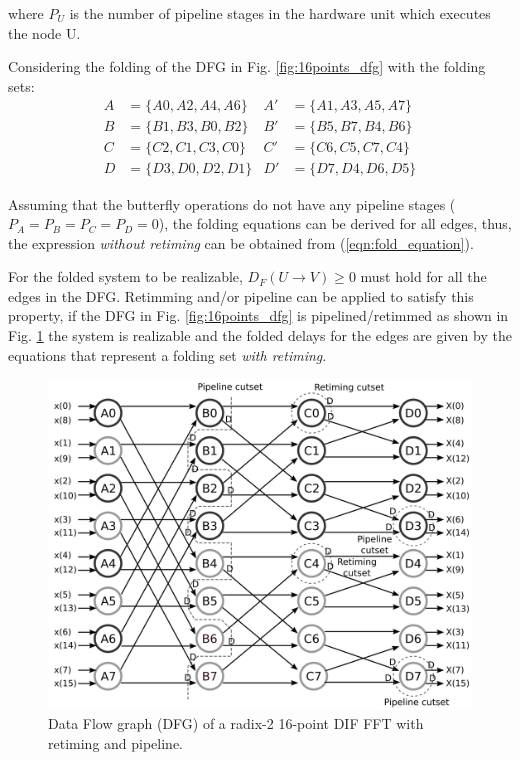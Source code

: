 \documentclass[journal,comsoc]{IEEEtran}
\begin{document}
where $P_U$ is the number of pipeline stages in the hardware unit which executes the node U.

Considering the folding of the DFG in Fig. \ref{fig:16points_dfg} with the folding sets:
\begin{align*}%
A&= \{ A0,A2,A4,A6 \}  & A'&= \{ A1,A3,A5,A7 \} \\
B&=\{ B1,B3,B0,B2 \}   &B'&=\{ B5,B7,B4,B6 \} 	\\
C&=\{ C2,C1,C3,C0 \}   &C'&=\{ C6,C5,C7,C4 \} 	\\ 
D&=\{ D3,D0,D2,D1 \}   &D'&=\{ D7,D4,D6,D5 \}  
\end{align*}

Assuming that the butterfly operations do not have any pipeline stages ($P_A=P_B=P_C=P_D=0$), the folding equations can be derived for all edges,
thus, the expression \textit{without retiming} can be obtained from (\ref{eqn:fold_equation}).

\begin{small}

\end{small}
For the folded system to be realizable, $D_F(U\to V)\geq0$ must hold for all the edges in the DFG. Retimming and/or pipeline can be applied to satisfy this property, if the DFG in Fig. \ref{fig:16points_dfg} is pipelined/retimmed as shown in Fig. \ref{fig:dfg_16_ret} the system is realizable and the folded delays for the edges are given by the equations that represent a folding set \textit{with retiming}.

\begin{figure} 
\centering
\includegraphics[width=\linewidth]{Diagramas/16points_dfg_ret.png}
\caption{Data Flow graph (DFG) of a radix-2 16-point DIF FFT with retiming and pipeline.}
\label{fig:dfg_16_ret}
\end{figure}
\begin{small}

\end{small}
\end{document}
